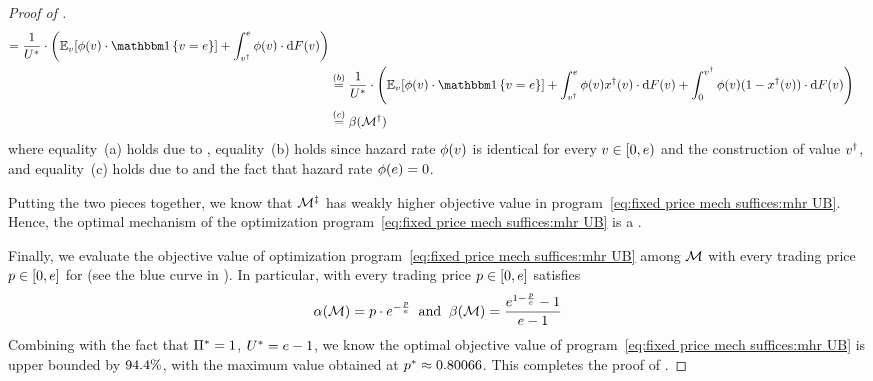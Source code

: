 \begin{proof}[Proof of ]
\begin{align*}
    =
    \frac{1}{\buyerbenchmark}\cdot 
    \left(\expect[\val]{\buyerhazardrate(\val)\cdot \indicator{\val= e}}
    +
    \displaystyle\int_{\val\primed}^{e} \buyerhazardrate(\val)\cdot \d\buyercdf(\val)
    \right)
    \\
    &\overset{(b)}{=}
    \frac{1}{\buyerbenchmark}\cdot 
    \left(\expect[\val]{\buyerhazardrate(\val)\cdot \indicator{\val= e}}
    +
    \displaystyle\int_{\val\primed}^{e} \buyerhazardrate(\val)\alloc\primed(\val)\cdot \d\buyercdf(\val)
    +
    \displaystyle\int_0^{\val\primed} \buyerhazardrate(\val)(1-\alloc\primed(\val))\cdot \d\buyercdf(\val)
    \right)
    \\
    &\overset{(c)}{=}
    \residuesurplusratio(\mech\primed)
\end{align*}
where equality~(a) holds due to ,
equality~(b) holds since hazard rate $\phi(v)$ is identical for every $v\in[0, e)$ and the construction of value $v^\dagger$,
and equality~(c) holds due to  and the fact that hazard rate $\phi(e) = 0$.

Putting the two pieces together, we know that {\FixPrice} $\mathcal{M}^\ddagger$ has weakly higher objective value in program~\eqref{eq:fixed price mech suffices:mhr UB}. Hence, the optimal mechanism of the optimization program~\eqref{eq:fixed price mech suffices:mhr UB} is a {\FixPrice}. 


Finally, we evaluate the objective value of optimization program~\eqref{eq:fixed price mech suffices:mhr UB} among {\FixPrice} $\mathcal{M}$ with every trading price $p\in[0, e]$ for  (see the blue curve in ). In particular, {\FixPrice} with every trading price $p \in[0, e]$ satisfies
\begin{align*}
    \alpha(\mathcal{M}) = p \cdot e^{-\frac{p}{e}}
    \;\;
    \mbox{and}
    \;\;
    \beta(\mathcal{M}) = \frac{e^{1-\frac{p}{e}} - 1}{e - 1} 
\end{align*}
Combining with the fact that $\Pi^* = 1$, $U^* = e-1$, we know the optimal objective value of program~\eqref{eq:fixed price mech suffices:mhr UB} is upper bounded by ${94.4\%}$, with the maximum value obtained at $p^*\approx 0.80066$. This completes the proof of .
\end{proof}

